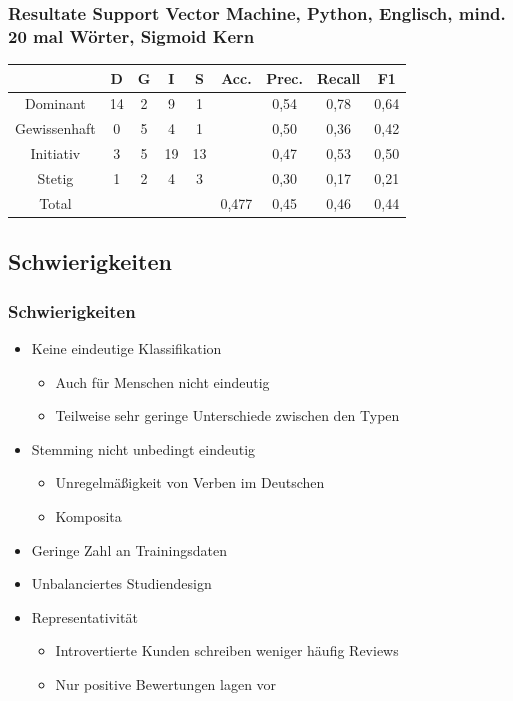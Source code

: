 \documentclass{beamer}
\begin{document}
\begin{frame}
\frametitle{Resultate Support Vector Machine, Python, Englisch, mind. 20 mal Wörter, Sigmoid Kern}
\begin{center}
\begin{tabular}{|c|c|c|c|c|c|c|c|c|}
\hline
				& D 	& G	& I & S	& Acc.	& Prec. & Recall	& F1\\
\hline
Dominant 		& 14		& 2 			& 9 		& 1 		&       	& 0,54	 	& 0,78	 	& 0,64\\
Gewissenhaft 	& 0 		& 5 			& 4 		& 1 		& 			& 0,50	 	& 0,36	 	& 0,42\\
Initiativ 		& 3 		& 5				& 19		& 13		& 			& 0,47		& 0,53	 	& 0,50\\
Stetig 			& 1 		& 2 			& 4 		& 3 		& 			& 0,30	   	& 0,17	 	& 0,21\\
\hline
Total 			& 			& 				& 			& 			& 0,477		& 0,45		& 0,46  	& 0,44\\
\hline
\end{tabular}
\end{center}
\end{frame}
\subsection{Schwierigkeiten}
\begin{frame}
\frametitle{Schwierigkeiten}
\begin{itemize}
	\item Keine eindeutige Klassifikation
	\begin{itemize}
		\item Auch für Menschen nicht eindeutig
		\item Teilweise sehr geringe Unterschiede zwischen den Typen
	\end{itemize}
	\item Stemming nicht unbedingt eindeutig
	\begin{itemize}
		\item Unregelmäßigkeit von Verben im Deutschen
		\item Komposita
	\end{itemize}
	\item Geringe Zahl an Trainingsdaten
	\item Unbalanciertes Studiendesign
	\item Representativität
	\begin{itemize}
		\item Introvertierte Kunden schreiben weniger häufig Reviews
		\item Nur positive Bewertungen lagen vor
	\end{itemize}
\end{itemize}
\end{frame}
\end{document}

